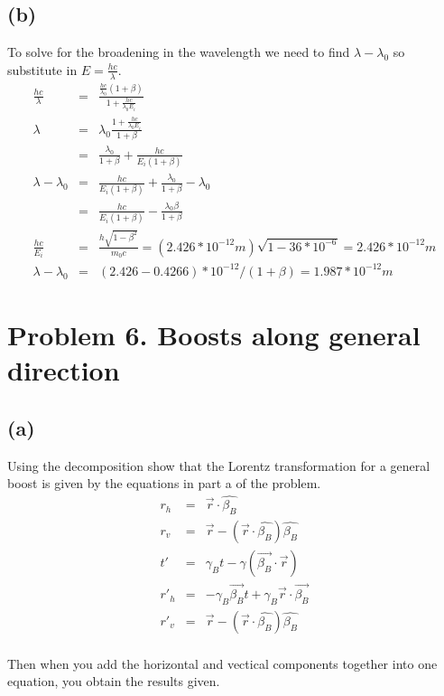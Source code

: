 \documentclass[11pt]{amsart}
\begin{document}
\subsection*{(b)} To solve for the broadening in the wavelength we need to find $\lambda-\lambda_{0}$ so substitute in $E=\frac{hc}{\lambda}$. \\
\begin{eqnarray*}
\frac{hc}{\lambda} &=& \frac{\frac{hc}{\lambda_{0}}(1+\beta)}{1+\frac{hc}{\lambda_{0}E_{i}}} \\
\lambda &=& \lambda_{0}\frac{1+\frac{hc}{\lambda_{0}E_{i}}}{1+\beta} \\
&=& \frac{\lambda_{0}}{1+\beta}+\frac{hc}{E_{i}(1+\beta)} \\
\lambda -\lambda_{0} &=& \frac{hc}{E_{i}(1+\beta)}+ \frac{\lambda_{0}}{1+\beta}-\lambda_{0} \\
&=&  \frac{hc}{E_{i}(1+\beta)}-\frac{\lambda_{0}\beta}{1+\beta} \\
\frac{hc}{E_{i}} &=& \frac{h\sqrt{1-\beta^{2}}}{m_{0}c} = (2.426*10^{-12}m)\sqrt{1-36*10^{-6}}=2.426*10^{-12}m \\
\lambda -\lambda_{0} &=& (2.426-0.4266)*10^{-12}/(1+\beta) = 1.987*10^{-12}m 
\end{eqnarray*}


\section*{Problem 6. Boosts along general direction}
\subsection*{(a)} Using the decomposition show that the Lorentz transformation for a general boost is given by the equations in part a of the problem. \\
\begin{eqnarray*}
r_{h} &=& \vec{r}\cdot{\hat{\beta_{B}}} \\
r_{v} &=& \vec{r}-(\vec{r}\cdot{\hat{\beta_{B}}}) \hat{\beta_{B}} \\
t' &=& \gamma_{B}t-\gamma(\vec{\beta_{B}}\cdot{\vec{r}}) \\
r'_{h} &=& -\gamma_{B}\vec{\beta_{B}}t+\gamma_{B}\vec{r}\cdot{\vec{\beta_{B}}} \\
r'_{v} &=& \vec{r}-(\vec{r}\cdot{\hat{\beta_{B}}} )\hat{\beta_{B}} 
\end{eqnarray*} \\
Then when you add the horizontal and vectical components together into one equation, you obtain the results given. \\
\end{document}
